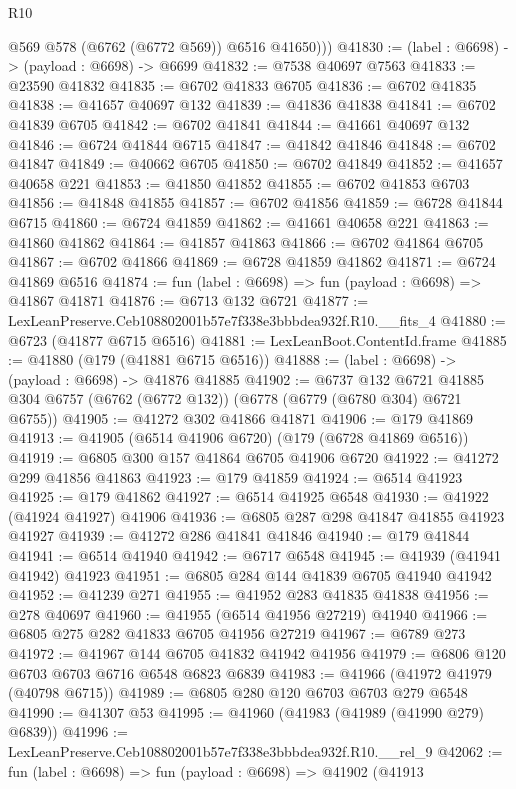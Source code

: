 \begin{lexlean}{R10}
\begin{coremodule}
          @569
          @578
          (@6762 (@6772 @569))
          @6516
          @41650)))
@41830 := (label : @6698) -> (payload : @6698) -> @6699
@41832 := @7538 @40697 @7563
@41833 := @23590 @41832
@41835 := @6702 @41833 @6705
@41836 := @6702 @41835
@41838 := @41657 @40697 @132
@41839 := @41836 @41838
@41841 := @6702 @41839 @6705
@41842 := @6702 @41841
@41844 := @41661 @40697 @132
@41846 := @6724 @41844 @6715
@41847 := @41842 @41846
@41848 := @6702 @41847
@41849 := @40662 @6705
@41850 := @6702 @41849
@41852 := @41657 @40658 @221
@41853 := @41850 @41852
@41855 := @6702 @41853 @6703
@41856 := @41848 @41855
@41857 := @6702 @41856
@41859 := @6728 @41844 @6715
@41860 := @6724 @41859
@41862 := @41661 @40658 @221
@41863 := @41860 @41862
@41864 := @41857 @41863
@41866 := @6702 @41864 @6705
@41867 := @6702 @41866
@41869 := @6728 @41859 @41862
@41871 := @6724 @41869 @6516
@41874 := fun (label : @6698) => fun (payload : @6698) => @41867 @41871
@41876 := @6713 @132 @6721
@41877 := LexLeanPreserve.Ceb108802001b57e7f338e3bbbdea932f.R10.__fits_4
@41880 := @6723 (@41877 @6715 @6516)
@41881 := LexLeanBoot.ContentId.frame
@41885 := @41880 (@179 (@41881 @6715 @6516))
@41888 := (label : @6698) -> (payload : @6698) -> @41876 @41885
@41902 := @6737
    @132
    @6721
    @41885
    @304
    @6757
    (@6762 (@6772 @132))
    (@6778 (@6779 (@6780 @304) @6721 @6755))
@41905 := @41272 @302 @41866 @41871
@41906 := @179 @41869
@41913 := @41905 (@6514 @41906 @6720) (@179 (@6728 @41869 @6516))
@41919 := @6805 @300 @157 @41864 @6705 @41906 @6720
@41922 := @41272 @299 @41856 @41863
@41923 := @179 @41859
@41924 := @6514 @41923
@41925 := @179 @41862
@41927 := @6514 @41925 @6548
@41930 := @41922 (@41924 @41927) @41906
@41936 := @6805 @287 @298 @41847 @41855 @41923 @41927
@41939 := @41272 @286 @41841 @41846
@41940 := @179 @41844
@41941 := @6514 @41940
@41942 := @6717 @6548
@41945 := @41939 (@41941 @41942) @41923
@41951 := @6805 @284 @144 @41839 @6705 @41940 @41942
@41952 := @41239 @271
@41955 := @41952 @283 @41835 @41838
@41956 := @278 @40697
@41960 := @41955 (@6514 @41956 @27219) @41940
@41966 := @6805 @275 @282 @41833 @6705 @41956 @27219
@41967 := @6789 @273
@41972 := @41967 @144 @6705 @41832 @41942 @41956
@41979 := @6806 @120 @6703 @6703 @6716 @6548 @6823 @6839
@41983 := @41966 (@41972 @41979 (@40798 @6715))
@41989 := @6805 @280 @120 @6703 @6703 @279 @6548
@41990 := @41307 @53
@41995 := @41960 (@41983 (@41989 (@41990 @279) @6839))
@41996 := LexLeanPreserve.Ceb108802001b57e7f338e3bbbdea932f.R10.__rel_9
@42062 := fun (label : @6698) =>
  fun (payload : @6698) =>
  @41902
    (@41913

\end{coremodule}
\end{lexlean}
